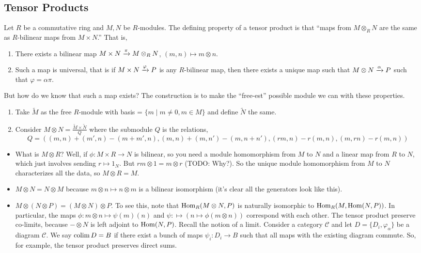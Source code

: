\subsection{Tensor Products}
Let $R$ be a commutative ring and $M, N$ be $R$-modules.
The defining property of a tensor product is that ``maps from $M \otimes_R N$ are
the same as $R$-bilinear maps from $M \times N$.'' That is,
\begin{enumerate}
    \item There exists a bilinear map $M \times N \xrightarrow{\pi} M \otimes_R N$, $(m, n) \mapsto m \otimes n$.
    \item Such a map is universal, that is if $M \times N \xrightarrow{\varphi} P$ is any $R$-bilinear map,
    then there exists a unique map such that $M \otimes N \xrightarrow{\alpha} P$
    such that $\varphi = \alpha \pi$.
\end{enumerate}
But how do we know that such a map exists? The construction
is to make the ``free-est'' possible module we can with these properties.
\begin{enumerate}
    \item Take $\tilde{M}$ as the free $R$-module with basis = $\{m \mid m \neq 0, m \in M\}$
    and define $\tilde{N}$ the same.
    \item Consider $M \otimes N = \frac{\tilde{M} \times \tilde{N}}{Q}$
    where the submodule $Q$ is the relations,
    \[ Q = ((m, n) + (m', n) - (m + m', n), (m, n)+(m, n') - (m, n + n'), (rm, n) - r(m, n), (m, rn) - r(m, n) )\]
\end{enumerate}
\begin{example}
    \begin{itemize}
    \item What is $M \otimes R$? Well,
    if $\phi: M \times R \to N$ is bilinear,
    so you need a module homomorphism from $M$ to $N$ and a linear map from $R$ to $N$,
    which just involves sending $r \mapsto 1_N$. But $rm \otimes 1 = m \otimes r$ (TODO: Why?).
    So the unique module homomorphism from $M$ to $N$ characterizes all the data, so
    $M \otimes R = M$.
    \item $M \otimes N = N \otimes M$ because $m \otimes n \mapsto n \otimes m$
    is a bilinear isomorphism (it's clear all the generators look like this).
    \item $M \otimes (N \otimes P) = (M \otimes N) \otimes P$.
    To see this, note that $\operatorname{Hom}_R(M \otimes N, P)$
    is naturally isomorphic to $\operatorname{Hom}_R(M, \operatorname{Hom}(N, P))$.
    In particular,
    the maps $\phi: m \otimes n \mapsto \psi(m)(n)$
    and $\psi: \mapsto (n \mapsto \phi(m \otimes n))$
    correspond with each other.
    The tensor product preserve co-limits, because $- \otimes N$ is left adjoint to $\operatorname{Hom}(N, P)$.
    Recall the notion of a limit. Consider a category $\mathcal{C}$ and let $D = \{ D_i, \varphi_{\alpha}\}$
    be a diagram $\mathcal{C}$. We say $\operatorname{colim} D = B$ if
    there exist a bunch of maps $\psi_i: D_i \to B$
    such that all maps with the existing diagram commute.
    So, for example, the tensor product preserves direct sums.
    \end{itemize}
\end{example}
